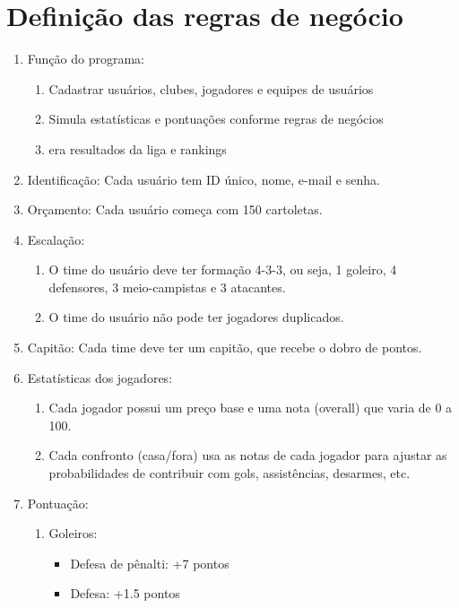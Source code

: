 \documentclass[12pt]{article}
\begin{document}
\section{Definição das regras de negócio}
\label{sec:regras}

\begin{enumerate}
  \item Função do programa:
        \begin{enumerate}
          \item Cadastrar usuários, clubes, jogadores e equipes de usuários
          \item Simula estatísticas e pontuações conforme regras de negócios
          \item era resultados da liga e rankings
        \end{enumerate}
  \item Identificação: Cada usuário tem ID único, nome, e-mail e senha.
  \item Orçamento: Cada usuário começa com 150 cartoletas.
  \item Escalação:
        \begin{enumerate}
          \item O time do usuário deve ter formação 4-3-3, ou seja, 1 goleiro, 4 defensores, 3 meio-campistas e 3 atacantes.
          \item O time do usuário não pode ter jogadores duplicados.
        \end{enumerate}
  \item Capitão: Cada time deve ter um capitão, que recebe o dobro de pontos.
  \item Estatísticas dos jogadores:
        \begin{enumerate}
          \item Cada jogador possui um preço base e uma nota (overall) que varia de 0 a 100.
          \item Cada confronto (casa/fora) usa as notas de cada jogador para ajustar as probabilidades de contribuir com gols, assistências, desarmes, etc.
        \end{enumerate}
  \item Pontuação:
        \begin{enumerate}
          \item Goleiros:
                \begin{itemize}
                  \item Defesa de pênalti: +7 pontos
                  \item Defesa: +1.5 pontos

\end{itemize}
\end{enumerate}
\end{enumerate}
\end{document}
